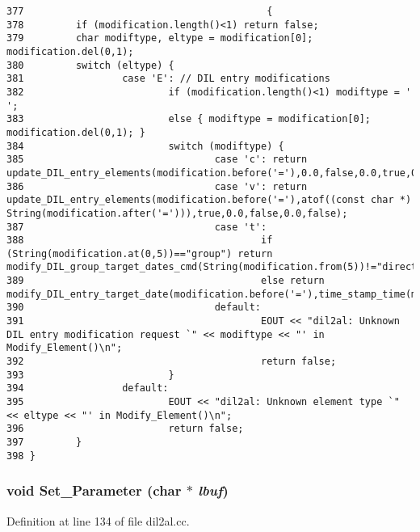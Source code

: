 \footnotesize\begin{verbatim}377                                          {
378         if (modification.length()<1) return false;
379         char modiftype, eltype = modification[0]; modification.del(0,1);
380         switch (eltype) {
381                 case 'E': // DIL entry modifications
382                         if (modification.length()<1) modiftype = ' ';
383                         else { modiftype = modification[0]; modification.del(0,1); }
384                         switch (modiftype) {
385                                 case 'c': return update_DIL_entry_elements(modification.before('='),0.0,false,0.0,true,0.0,false,time_stamp_time(modification.after('=')));
386                                 case 'v': return update_DIL_entry_elements(modification.before('='),atof((const char *) String(modification.after('='))),true,0.0,false,0.0,false);
387                                 case 't':
388                                         if (String(modification.at(0,5))=="group") return modify_DIL_group_target_dates_cmd(String(modification.from(5))!="direct");
389                                         else return modify_DIL_entry_target_date(modification.before('='),time_stamp_time(modification.after('=')));
390                                 default:
391                                         EOUT << "dil2al: Unknown DIL entry modification request `" << modiftype << "' in Modify_Element()\n";
392                                         return false;
393                         }
394                 default:
395                         EOUT << "dil2al: Unknown element type `" << eltype << "' in Modify_Element()\n";
396                         return false;
397         }
398 }
\end{verbatim}\normalsize 
{}
\subsubsection{\setlength{\rightskip}{0pt plus 5cm}void Set\_\-Parameter (char $\ast$ {\em lbuf})}\label{dil2al_8cc_a100}




Definition at line 134 of file dil2al.cc.

